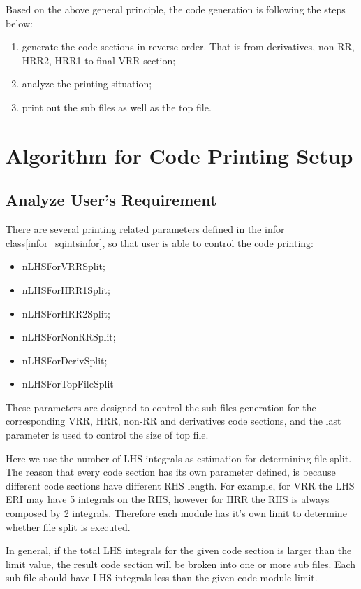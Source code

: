 Based on the above general principle, the code generation is following the 
steps below:
\begin{enumerate}
 \item generate the code sections in reverse order. That is from derivatives,
 non-RR, HRR2, HRR1 to final VRR section;
 \item analyze the printing situation;
 \item print out the sub files as well as the top file.
\end{enumerate}

\section{Algorithm for Code Printing Setup}

\subsection{Analyze User's Requirement}
\label{code_generation_user}

There are several printing related parameters defined in the infor class\ref{infor_sqintsinfor}, 
so that user is able to control the code printing:
\begin{itemize}
 \item nLHSForVRRSplit;
 \item nLHSForHRR1Split;
  \item nLHSForHRR2Split;
 \item nLHSForNonRRSplit;
 \item nLHSForDerivSplit;
 \item nLHSForTopFileSplit
\end{itemize}
These parameters are designed to control the sub files generation 
for the corresponding VRR, HRR, non-RR and derivatives code sections, and the last
parameter is used to control the size of top file.

Here we use the number of LHS integrals as estimation for determining file split.
The reason that every code section has its own parameter defined, is because
different code sections have different RHS length. For example, for VRR the 
LHS ERI may have 5 integrals on the RHS, however for HRR the RHS is always
composed by 2 integrals. Therefore each module has it's own limit to determine
whether file split is executed.

In general, if the total LHS integrals for the given code section is larger 
than the limit value, the result code section will be broken into one or more sub files.
Each sub file should have LHS integrals less than the given code module limit.

